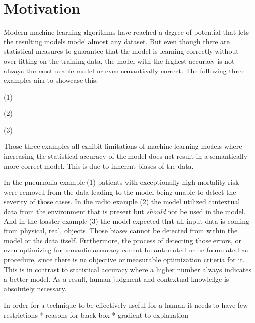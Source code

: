 \section{Motivation}
Modern machine learning algorithms have reached a degree of potential that lets the resulting models model almost any dataset.
But even though there are statistical measures to guarantee that the model is learning correctly without over fitting on the training data, the model with the highest accuracy is not always the most usable model or even semantically correct.
The following three examples aim to showcase this:

\par \noindent (1)

\par \noindent (2)

\par \noindent (3)

Those three examples all exhibit limitations of machine learning models where increasing the statistical accuracy of the model does not result in a semantically more correct model.
This is due to inherent biases of the data.

In the pneumonia example (1) patients with exceptionally high mortality risk were removed from the data leading to the model being unable to detect the severity of those cases.
In the radio example (2) the model utilized contextual data from the environment that is present but \emph{should} not be used in the model.
And in the toaster example (3) the model expected that all input data is coming from physical, real, objects.
Those biases cannot be detected from within the model or the data itself.
Furthermore, the process of detecting those errors, or even optimizing for semantic accuracy cannot be automated or be formulated as procedure, since there is no objective or measurable optimization criteria for it.
This is in contrast to statistical accuracy where a higher number always indicates a better model.
As a result, human judgment and contextual knowledge is absolutely necessary.

In order for a technique to be effectively useful for a human it needs to have few restrictions \todo{}
* reasons for black box
* gradient to explanation